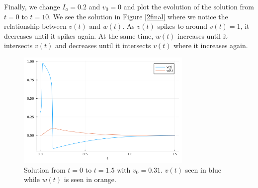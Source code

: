 \documentclass[12pt]{report}
\begin{document}
\begin{solution}
    \noindent
    Finally, we change $I_a = 0.2$ and $v_0 = 0$ and plot the evolution of the solution from $t=0$ to $t=10$. We see the solution in Figure \ref{2final} where we notice the relationship between $v(t)$ and $w(t)$. As $v(t)$ spikes to around $v(t)=1$, it decreases until it spikes again. At the same time, $w(t)$ increases until it intersects $v(t)$ and decreases until it intersects $v(t)$ where it increases again.


    \begin{figure}[H]
        \centering
        \includegraphics[width=0.75\textwidth,height=\textwidth,keepaspectratio]{images/2-sol1.png}
        \caption{Solution from $t=0$ to $t=1.5$ with $v_0 = 0.31$. $v(t)$ seen in blue while $w(t)$ is seen in orange. }
        \label{2sol1}
    \end{figure}
    \begin{figure}[H]
        \centering

\end{figure}
\end{solution}
\end{document}
